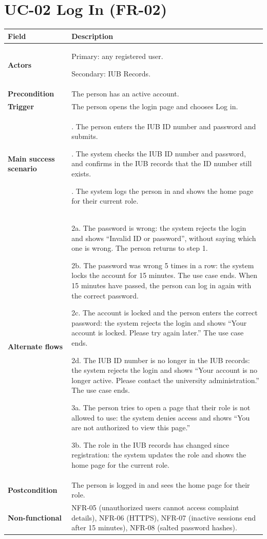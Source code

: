 \documentclass[11pt,a4paper]{report}
\begin{document}
\section{UC-02 Log In (FR-02)}
\begin{longtable}{|>{\raggedright\arraybackslash}p{3.0cm}|>{\raggedright\arraybackslash}p{12.4cm}|}
\hline \textbf{Field} & \textbf{Description} \\ \hline \endhead
\textbf{Actors} & Primary: any registered user.\par\smallskip Secondary: IUB Records. \\ \hline
\textbf{Precondition} & The person has an active account. \\ \hline
\textbf{Trigger} & The person opens the login page and chooses Log in. \\ \hline
\textbf{Main success scenario} & 1. The person enters the IUB ID number and password and submits.\par\smallskip 2. The system checks the IUB ID number and password, and confirms in the IUB records that the ID number still exists.\par\smallskip 3. The system logs the person in and shows the home page for their current role. \\ \hline
\textbf{Alternate flows} & 2a. The password is wrong: the system rejects the login and shows ``Invalid ID or password'', without saying which one is wrong. The person returns to step 1.\par\smallskip 2b. The password was wrong 5 times in a row: the system locks the account for 15 minutes. The use case ends. When 15 minutes have passed, the person can log in again with the correct password.\par\smallskip 2c. The account is locked and the person enters the correct password: the system rejects the login and shows ``Your account is locked. Please try again later.'' The use case ends.\par\smallskip 2d. The IUB ID number is no longer in the IUB records: the system rejects the login and shows ``Your account is no longer active. Please contact the university administration.'' The use case ends.\par\smallskip 3a. The person tries to open a page that their role is not allowed to use: the system denies access and shows ``You are not authorized to view this page.''\par\smallskip 3b. The role in the IUB records has changed since registration: the system updates the role and shows the home page for the current role. \\ \hline
\textbf{Postcondition} & The person is logged in and sees the home page for their role. \\ \hline
\textbf{Non-functional} & NFR-05 (unauthorized users cannot access complaint details), NFR-06 (HTTPS), NFR-07 (inactive sessions end after 15 minutes), NFR-08 (salted password hashes). \\ \hline
\end{longtable}
\end{document}
